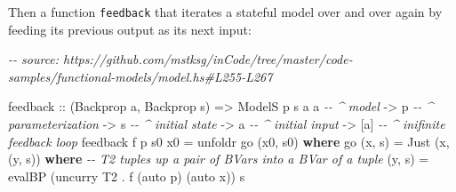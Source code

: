 \documentclass[]{article}
\newenvironment{Shaded}{}{}
\newcommand{\CommentTok}[1]{\textcolor[rgb]{0.38,0.63,0.69}{\textit{#1}}}
\newcommand{\DataTypeTok}[1]{\textcolor[rgb]{0.56,0.13,0.00}{#1}}
\newcommand{\FunctionTok}[1]{\textcolor[rgb]{0.02,0.16,0.49}{#1}}
\newcommand{\KeywordTok}[1]{\textcolor[rgb]{0.00,0.44,0.13}{\textbf{#1}}}
\newcommand{\NormalTok}[1]{#1}
\newcommand{\OperatorTok}[1]{\textcolor[rgb]{0.40,0.40,0.40}{#1}}
\newcommand{\OtherTok}[1]{\textcolor[rgb]{0.00,0.44,0.13}{#1}}
\begin{document}
\begin{Shaded}
\end{Shaded}

Then a function \texttt{feedback} that iterates a stateful model over and over
again by feeding its previous output as its next input:

\begin{Shaded}
\begin{Highlighting}[]
\CommentTok{{-}{-} source: https://github.com/mstksg/inCode/tree/master/code{-}samples/functional{-}models/model.hs\#L255{-}L267}

\NormalTok{feedback}
\OtherTok{    ::}\NormalTok{ (}\DataTypeTok{Backprop}\NormalTok{ a, }\DataTypeTok{Backprop}\NormalTok{ s)}
    \OtherTok{=\textgreater{}} \DataTypeTok{ModelS}\NormalTok{ p s a a     }\CommentTok{{-}{-} \^{} model}
    \OtherTok{{-}\textgreater{}}\NormalTok{ p                  }\CommentTok{{-}{-} \^{} parameterization}
    \OtherTok{{-}\textgreater{}}\NormalTok{ s                  }\CommentTok{{-}{-} \^{} initial state}
    \OtherTok{{-}\textgreater{}}\NormalTok{ a                  }\CommentTok{{-}{-} \^{} initial input}
    \OtherTok{{-}\textgreater{}}\NormalTok{ [a]                }\CommentTok{{-}{-} \^{} inifinite feedback loop}
\NormalTok{feedback f p s0 x0 }\OtherTok{=}\NormalTok{ unfoldr go (x0, s0)}
  \KeywordTok{where}
\NormalTok{    go (x, s) }\OtherTok{=} \DataTypeTok{Just}\NormalTok{ (x, (y, s\textquotesingle{}))}
      \KeywordTok{where}
        \CommentTok{{-}{-} \textquotesingle{}T2\textquotesingle{} tuples up a pair of \textquotesingle{}BVar\textquotesingle{}s into a \textquotesingle{}BVar\textquotesingle{} of a tuple}
\NormalTok{        (y, s\textquotesingle{}) }\OtherTok{=}\NormalTok{ evalBP (}\FunctionTok{uncurry} \DataTypeTok{T2} \OperatorTok{.}\NormalTok{ f (auto p) (auto x)) s}
\end{Highlighting}
\end{Shaded}
\end{document}
